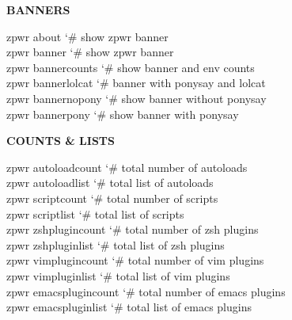 \documentclass[11pt,a4paper,twoside]{book}
\begin{document}
\vspace{12pt}
{\bfseries\color{neonyellow} BANNERS}\vspace{4pt}

\begin{codebox}
\color{neongreen}zpwr about                 {\char`\#} show zpwr banner\\
\color{neongreen}zpwr banner                {\char`\#} show zpwr banner\\
\color{neongreen}zpwr bannercounts          {\char`\#} show banner and env counts\\
\color{neongreen}zpwr bannerlolcat          {\char`\#} banner with ponysay and lolcat\\
\color{neongreen}zpwr bannernopony          {\char`\#} show banner without ponysay\\
\color{neongreen}zpwr bannerpony            {\char`\#} show banner with ponysay\\
\end{codebox}


\vspace{12pt}
{\bfseries\color{neonyellow} COUNTS \& LISTS}\vspace{4pt}

\begin{codebox}
\color{neongreen}zpwr autoloadcount         {\char`\#} total number of autoloads\\
\color{neongreen}zpwr autoloadlist          {\char`\#} total list of autoloads\\
\color{neongreen}zpwr scriptcount           {\char`\#} total number of scripts\\
\color{neongreen}zpwr scriptlist            {\char`\#} total list of scripts\\
\color{neongreen}zpwr zshplugincount        {\char`\#} total number of zsh plugins\\
\color{neongreen}zpwr zshpluginlist         {\char`\#} total list of zsh plugins\\
\color{neongreen}zpwr vimplugincount        {\char`\#} total number of vim plugins\\
\color{neongreen}zpwr vimpluginlist         {\char`\#} total list of vim plugins\\
\color{neongreen}zpwr emacsplugincount      {\char`\#} total number of emacs plugins\\
\color{neongreen}zpwr emacspluginlist       {\char`\#} total list of emacs plugins\\
\end{codebox}
\end{document}

